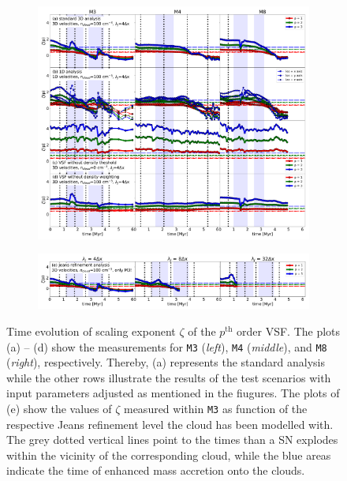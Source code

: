\begin{figure}[!htb]
	\centering  
  
  \begin{subfigure}[c]{\textwidth}
      \includegraphics[width=\textwidth]{zeta_all_nojeans.pdf}
      \label{pic:results:zeta_all_nojeans}
  \end{subfigure}
  
  \begin{subfigure}[c]{\textwidth}
      \addtocounter{subfigure}{4}
      \includegraphics[width=\textwidth]{zeta_jeans.pdf}
      \label{pic:results:zeta_all_jeans}
  \end{subfigure}
  
  \caption{Time evolution of scaling exponent $\zeta$ of the $p^\mathrm{th}$ order VSF. The plots (a) -- (d) show the measurements for \texttt{M3} (\textit{left}), \texttt{M4} (\textit{middle}), and \texttt{M8} (\textit{right}), respectively. Thereby, (a) represents the standard analysis while the other rows illustrate the results of the test scenarios with input parameters adjusted as mentioned in the fiugures. The plots of (e) show the values of $\zeta$ measured within \texttt{M3} as function of the respective Jeans refinement level the cloud has been modelled with. The grey dotted vertical lines point to the times than a SN explodes within the vicinity of the corresponding cloud, while the blue areas indicate the time of enhanced mass accretion onto the clouds.}
	\label{pic:results:zeta_all}
\end{figure}

